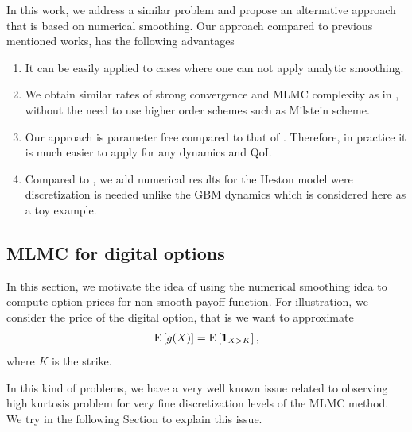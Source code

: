 In this work, we address a similar problem and  propose an alternative approach that is  based on numerical smoothing. Our approach compared to previous mentioned works, has the following advantages
\begin{enumerate}
\item It can be easily applied to cases where one can not apply analytic smoothing.
\item We obtain similar  rates of strong convergence and MLMC complexity  as in  \cite{giles2008improved,giles2013numerical}, without the need to use higher order schemes such as Milstein scheme.
\item Our approach is parameter free compared to that of  \cite{giles2015multilevel}. Therefore, in practice it is much easier to apply for any dynamics and QoI.
\item Compared to \cite{giles2008improved,giles2013numerical,giles2015multilevel}, we add numerical results for the Heston model were discretization is needed unlike the GBM dynamics which is considered here as a toy example.
\end{enumerate} 

\subsection{MLMC for digital options}\label{sec: MLMC for digital options}
In this section, we motivate the idea of using the numerical smoothing idea to compute option prices for non smooth payoff function. For illustration, we consider  the price of the digital option, that is we want to approximate
\begin{align}
\mathrm{E}\left[g(X)\right]=\mathrm{E}\left[\mathbf{1}_{X>K}\right],
\end{align}
where $K$ is the strike. 

In this kind of problems, we have a very well known issue related to observing high kurtosis problem for very fine discretization levels of the MLMC method. We try in the following Section to explain this issue.
